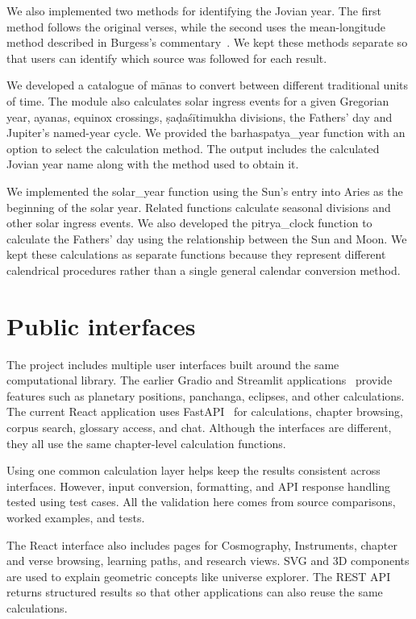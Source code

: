 \documentclass[12pt,a4paper,oneside]{report}
\begin{document}
We also implemented two methods for identifying the Jovian year. The first method follows the original verses, while the second uses the mean-longitude method described in Burgess's commentary~\cite{burgess1860}. We kept these methods separate so that users can identify which source was followed for each result.

We developed a catalogue of mānas to convert between different traditional units of time. The module also calculates solar ingress events for a given Gregorian year, ayanas, equinox crossings, ṣaḍaśītimukha divisions, the Fathers' day and Jupiter's named-year cycle. We provided the barhaspatya\_year function with an option to select the calculation method. The output includes the calculated Jovian year name along with the method used to obtain it.

We implemented the solar\_year function using the Sun's entry into Aries as the beginning of the solar year. Related functions calculate seasonal divisions and other solar ingress events. We also developed the pitrya\_clock function to calculate the Fathers' day using the relationship between the Sun and Moon. We kept these calculations as separate functions because they represent different calendrical procedures rather than a single general calendar conversion method.

\section{Public interfaces}

The project includes multiple user interfaces built around the same computational library. The earlier Gradio and Streamlit applications~\cite{gradio,streamlit} provide features such as planetary positions, panchanga, eclipses, and other calculations. The current React application uses FastAPI~\cite{react,fastapi} for calculations, chapter browsing, corpus search, glossary access, and chat. Although the interfaces are different, they all use the same chapter-level calculation functions.

Using one common calculation layer helps keep the results consistent across interfaces. However, input conversion, formatting, and API response handling tested using test cases. All the validation here comes from source comparisons, worked examples, and tests.

The React interface also includes pages for Cosmography, Instruments, chapter and verse browsing, learning paths, and research views. SVG and 3D components are used to explain geometric concepts like universe explorer. The REST API returns structured results so that other applications can also reuse the same calculations.
\end{document}
